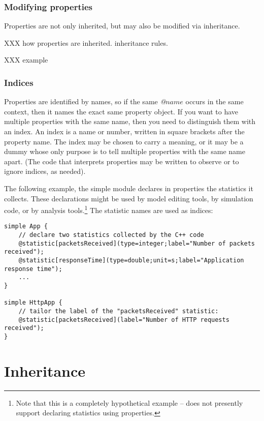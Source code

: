 \subsubsection{Modifying properties}

Properties are not only inherited, but may also be modified via inheritance.

XXX how properties are inherited. inheritance rules.

XXX example


\subsubsection{Indices}

Properties are identified by names, so if the same \textit{@$name$} occurs
in the same context, then it names the exact same property object. If you
want to have multiple properties with the same name, then you need to
distinguish them with an index. An index is a name or number, written in
square brackets after the property name. The index may be chosen to carry
a meaning, or it may be a dummy whose only purpose is to tell multiple
properties with the same name apart. (The code that interprets properties
may be written to observe or to ignore indices, as needed).

The following example, the simple module declares in properties the
statistics it collects. These declarations might be used by model editing
tools, by simulation code, or by analysis tools.\footnote{Note that this is
a completely hypothetical example -- {\opp} does not presently support
declaring statistics using properties.} The statistic names are
used as indices:

\begin{Verbatim}
simple App {
    // declare two statistics collected by the C++ code
    @statistic[packetsReceived](type=integer;label="Number of packets received");
    @statistic[responseTime](type=double;unit=s;label="Application response time");
    ...
}

simple HttpApp {
    // tailor the label of the "packetsReceived" statistic:
    @statistic[packetsReceived](label="Number of HTTP requests received");
}
\end{Verbatim}



\section{Inheritance}
\label{sec:ch-ned-lang:inheritance}

